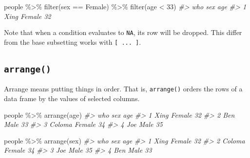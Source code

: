\documentclass[
]{book}
\newenvironment{Shaded}{\begin{snugshade}}{\end{snugshade}}
\newcommand{\CommentTok}[1]{\textcolor[rgb]{0.56,0.35,0.01}{\textit{#1}}}
\newcommand{\DecValTok}[1]{\textcolor[rgb]{0.00,0.00,0.81}{#1}}
\newcommand{\FunctionTok}[1]{\textcolor[rgb]{0.00,0.00,0.00}{#1}}
\newcommand{\NormalTok}[1]{#1}
\newcommand{\SpecialCharTok}[1]{\textcolor[rgb]{0.00,0.00,0.00}{#1}}
\newcommand{\StringTok}[1]{\textcolor[rgb]{0.31,0.60,0.02}{#1}}
\begin{document}
\begin{Shaded}
\begin{Highlighting}[]
\NormalTok{people }\SpecialCharTok{\%\textgreater{}\%} \FunctionTok{filter}\NormalTok{(sex }\SpecialCharTok{==} \StringTok{\textquotesingle{}Female\textquotesingle{}}\NormalTok{) }\SpecialCharTok{\%\textgreater{}\%} \FunctionTok{filter}\NormalTok{(age }\SpecialCharTok{\textless{}} \DecValTok{33}\NormalTok{)}
\CommentTok{\#\textgreater{}    who    sex age}
\CommentTok{\#\textgreater{} 1 Xing Female  32}
\end{Highlighting}
\end{Shaded}

Note that when a condition evaluates to \texttt{NA}, its row will be dropped. This differ from the base subsetting works with \texttt{{[}\ ...\ {]}}.

\hypertarget{arrange}{%
\subsection*{\texorpdfstring{\texttt{arrange()}}{arrange()}}\label{arrange}}

Arrange means putting things in order. That is, \texttt{arrange()} orders the rows of a data frame by the values of selected columns.

\begin{Shaded}
\begin{Highlighting}[]
\NormalTok{people }\SpecialCharTok{\%\textgreater{}\%} \FunctionTok{arrange}\NormalTok{(age)}
\CommentTok{\#\textgreater{}      who    sex age}
\CommentTok{\#\textgreater{} 1   Xing Female  32}
\CommentTok{\#\textgreater{} 2    Ben   Male  33}
\CommentTok{\#\textgreater{} 3 Coloma Female  34}
\CommentTok{\#\textgreater{} 4    Joe   Male  35}
\end{Highlighting}
\end{Shaded}

\begin{Shaded}
\begin{Highlighting}[]
\NormalTok{people }\SpecialCharTok{\%\textgreater{}\%} \FunctionTok{arrange}\NormalTok{(sex)}
\CommentTok{\#\textgreater{}      who    sex age}
\CommentTok{\#\textgreater{} 1   Xing Female  32}
\CommentTok{\#\textgreater{} 2 Coloma Female  34}
\CommentTok{\#\textgreater{} 3    Joe   Male  35}
\CommentTok{\#\textgreater{} 4    Ben   Male  33}
\end{Highlighting}
\end{Shaded}
\end{document}
